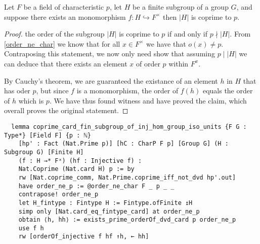 \begin{lemma}
  \label{coprime_card_fin_subgroup_of_inj_hom_group_iso_units}
  \leanok
  Let $F$ be a field of characteristic $p$, let $H$ be a finite subgroup of a group $G$, and suppose there exists an monomorphism $f : H \hookrightarrow F^\times$
  then $|H|$ is coprime to $p$.
\end{lemma}
\begin{proof}
\leanok
the order of the subgroup $|H|$ is coprime to $p$ if and only if $p \nmid |H|$. From \ref{order_ne_char} we know that
for all $x \in F^\times$ we have that $o(x) \ne p$. Contraposing this statement, we now only need show that assuming $p \mid |H|$ we can deduce that
there exists an element $x$ of order $p$ within $F^x$.

By Cauchy's theorem, we are guaranteed the existance of an element $h$ in $H$ that has oder $p$, but since $f$ is a monomorphism, the order of $f(h)$ equals the order of $h$ which is $p$.
We have thus found witness and have proved the claim, which overall proves the original statement.
\end{proof}
\begin{footnotesize}
  \begin{verbatim}
  lemma coprime_card_fin_subgroup_of_inj_hom_group_iso_units {F G : Type*} [Field F] {p : ℕ}
    [hp' : Fact (Nat.Prime p)] [hC : CharP F p] [Group G] (H : Subgroup G) [Finite H]
    (f : H →* Fˣ) (hf : Injective f) :
    Nat.Coprime (Nat.card H) p := by
    rw [Nat.coprime_comm, Nat.Prime.coprime_iff_not_dvd hp'.out]
    have order_ne_p := @order_ne_char F _ p _ _
    contrapose! order_ne_p
    let H_fintype : Fintype H := Fintype.ofFinite ↥H
    simp only [Nat.card_eq_fintype_card] at order_ne_p
    obtain ⟨h, hh⟩ := exists_prime_orderOf_dvd_card p order_ne_p
    use f h
    rw [orderOf_injective f hf ↑h, ← hh]
  \end{verbatim}
  \end{footnotesize}


